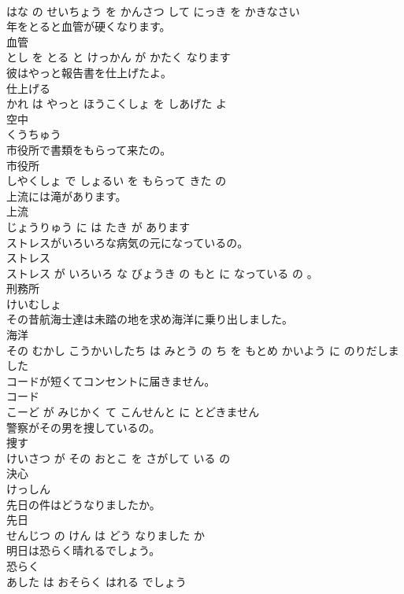\documentclass[8pt]{extreport}
\begin{document}
\begin{CJK}{UTF8}{min}
\\	はな の せいちょう を かんさつ して にっき を かきなさい			
\\	年をとると血管が硬くなります。	
\\	血管 
\\	とし を とる と けっかん が かたく なります			
\\	彼はやっと報告書を仕上げたよ。	
\\	仕上げる 
\\	かれ は やっと ほうこくしょ を しあげた よ			
\\	空中	
\\	くうちゅう		
\\	市役所で書類をもらって来たの。	
\\	市役所 
\\	しやくしょ で しょるい を もらって きた の			
\\	上流には滝があります。	
\\	上流 
\\	じょうりゅう に は たき が あります			
\\	ストレスがいろいろな病気の元になっているの。	
\\	ストレス 
\\	ストレス が いろいろ な びょうき の もと に なっている の 。			
\\	刑務所	
\\	けいむしょ		
\\	その昔航海士達は未踏の地を求め海洋に乗り出しました。	
\\	海洋 
\\	その むかし こうかいしたち は みとう の ち を もとめ かいよう に のりだしました			
\\	コードが短くてコンセントに届きません。	
\\	コード 
\\	こーど が みじかく て こんせんと に とどきません			
\\	警察がその男を捜しているの。	
\\	捜す 
\\	けいさつ が その おとこ を さがして いる の			
\\	決心	
\\	けっしん		
\\	先日の件はどうなりましたか。	
\\	先日 
\\	せんじつ の けん は どう なりました か			
\\	明日は恐らく晴れるでしょう。	
\\	恐らく 
\\	あした は おそらく はれる でしょう			

\end{CJK}
\end{document}
